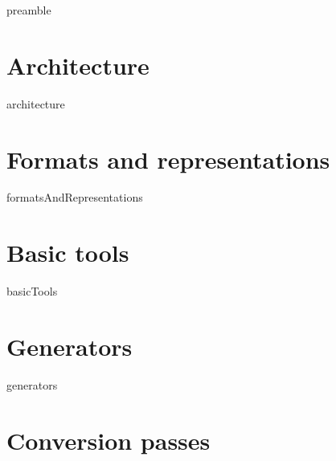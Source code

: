 \documentclass[12pt,a4paper]{article}
\begin{document}



{preamble}


\section{Architecture}

{architecture}


\newpage

\section{Formats and representations}

{formatsAndRepresentations}


\section{Basic tools}

{basicTools}


\section{Generators}

{generators}


\newpage

\section{Conversion passes}
\end{document}

